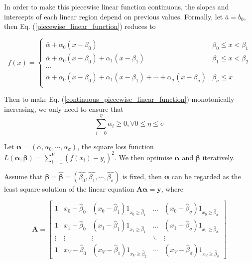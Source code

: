 In order to make this piecewise linear function continuous, the slopes and intercepts of each linear region depend on previous values. Formally, let $\bar{a}=b_0$, then Eq. (\ref{piecewise_linear_function}) reduces to

\begin{equation}
	\label{continuous_piecewise_linear_function}
	f(x)= \begin{cases} 
      \bar{\alpha}+\alpha_0(x-\beta_0) & \beta_0\leq x < \beta_1 \\
      \bar{\alpha}+\alpha_0(x-\beta_0) + \alpha_1(x-\beta_1) &  \beta_1\leq x < \beta_2 \\
      \cdots \\
      \bar{\alpha}+\alpha_0(x-\beta_0) + \alpha_1(x-\beta_1)+\cdots+\alpha_\sigma(x-\beta_\sigma) &  \beta_\sigma\leq x \\
   \end{cases}
\end{equation}


Then to make Eq. (\ref{continuous_piecewise_linear_function}) monotonically increasing, we only need to ensure that $$\sum_{i=0}^\eta \alpha_i\geq 0, \forall 0\leq \eta\leq \sigma$$

Let $\boldsymbol{\alpha}=(\bar{\alpha},\alpha_0,\cdots,\alpha_\sigma)$, the square loss function $L(\boldsymbol{\alpha},\boldsymbol{\beta})=\sum_{i=1}^{V}(f(x_i)-y_i)^2$. We then optimise $\boldsymbol{\alpha}$ and $\boldsymbol{\beta}$ iteratively.

Assume that $\boldsymbol{\beta}=\hat{\boldsymbol{\beta}}=(\hat{\beta_0},\hat{\beta_1},\cdots,\hat{\beta_\sigma})$ is fixed, then $\boldsymbol{\alpha}$ can be regarded as the least square solution of the linear equation $\boldsymbol{A\alpha}=\boldsymbol{y}$, where

$$
\boldsymbol{A}=\left[\begin{array}{ccccc}
1 & x_{0}-\hat{\beta}_{0} & \left(x_{0}-\hat{\beta}_{1}\right) 1_{x_{0} \geq \hat{\beta}_{1}} & \ldots & \left(x_{0}-\hat{\beta}_{\sigma}\right) 1_{x_{0} \geq \hat{\beta}_{\sigma}} \\
1 & x_{1}-\hat{\beta}_{0} & \left(x_{1}-\hat{\beta}_{1}\right) 1_{x_{1} \geq \hat{\beta}_{1}} & \ldots & \left(x_{1}-\hat{\beta}_{\sigma}\right) 1_{x_{1} \geq \hat{\beta}_{\sigma}} \\
\vdots & \vdots & \vdots & \ddots & \vdots \\
1 & x_{V}-\hat{\beta}_{0} & \left(x_{V}-\hat{\beta}_{1}\right) 1_{x_{V} \geq \hat{\beta}_{2}} & \cdots & \left(x_{V}-\hat{\beta}_{\sigma}\right) 1_{x_{V} \geq \hat{\beta}_{\sigma}}
\end{array}\right]$$

